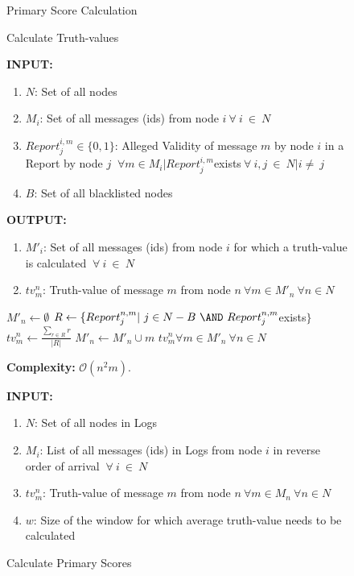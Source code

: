 \documentclass[journal]{IEEEtran}
\makeatletter
\newcommand{\removelatexerror}{\let\@latex@error\@gobble}
\makeatother
\begin{document}
\begin{figure}[!t]\removelatexerror
	\caption{Primary Score Calculation} 
	\label{fig:ALG_PSCalc}
\begin{algorithm}[H]
	\caption{Calculate Truth-values}
	\label{algo:TVCalc}
	\textbf{INPUT:}
		\begin{enumerate}
		\item $ N $: Set of all nodes
		\item $ M_i $: Set of all messages (ids) from node $ i\ \forall\ i\ \in\ N$
		\item $ Report^{i,m}_j \in\{0,1\}$: Alleged Validity of message $ m $ by node $ i $ in a Report by node $ j $ $\ \forall m\in M_i|Report^{i,m}_j $exists$\ \forall\ i,j\ \in\ N | i\neq\ j $
		\item $B$: Set of all blacklisted nodes
		\end{enumerate}
	\textbf{OUTPUT:}
		\begin{enumerate}
			\item $ M'_i $: Set of all messages (ids) from node $ i $ for which a truth-value is calculated $\ \forall\ i\ \in\ N$
			\item $ tv^n_m $: Truth-value of message $ m $ from node $n\ \forall m\in M'_n\ \forall n\in N$
		\end{enumerate} 
	\begin{algorithmic}[1]
			\STATE $ M'_n \leftarrow \emptyset $
				\STATE $ R \leftarrow\{Report^{n,m}_j|\ j\in N-B\ \AND\ Report^{n,m}_j$exists$ \} $
					\STATE $ tv^n_m \leftarrow \frac{\sum_{r\in R}r}{|R|} $
					\STATE $ M'_n \leftarrow M'_n \cup {m} $
				\ENDIF
			\ENDFOR
		\ENDFOR
	\RETURN $  tv^n_m \forall m\in M'_n\ \forall n\in N $
	\end{algorithmic}
	\textbf{Complexity:} $\mathcal{O}(n^2m)$.
\end{algorithm}
\begin{algorithm}[H]
	\caption{Calculate Primary Scores}
	\label{algo:PSCalc}
	\textbf{INPUT:}
	\begin{enumerate}
		\item $ N $: Set of all nodes in Logs
		\item $ M_i $: List of all messages (ids) in Logs from node $ i $ in reverse order of arrival $\ \forall\ i\ \in\ N$ 
		\item $ tv^n_m $: Truth-value of message $ m $ from node $n\ \forall m\in M_n\ \forall n\in N$
		\item $ w $: Size of the window for which average truth-value needs to be calculated

\end{enumerate}
\end{algorithm}
\end{figure}
\end{document}
